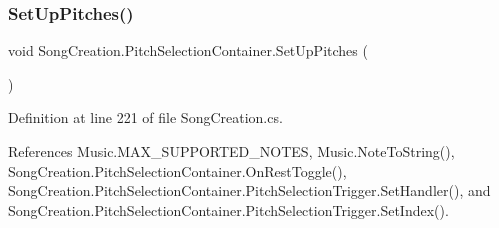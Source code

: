 \mbox{\label{group___s_c_handlers_ga77883e72bde65d22eaa2ace411fd9206}} 
\subsubsection{\texorpdfstring{Set\+Up\+Pitches()}{SetUpPitches()}}
{\footnotesize\ttfamily void Song\+Creation.\+Pitch\+Selection\+Container.\+Set\+Up\+Pitches (\begin{DoxyParamCaption}{ }\end{DoxyParamCaption})}



Definition at line 221 of file Song\+Creation.\+cs.



References Music.\+M\+A\+X\+\_\+\+S\+U\+P\+P\+O\+R\+T\+E\+D\+\_\+\+N\+O\+T\+ES, Music.\+Note\+To\+String(), Song\+Creation.\+Pitch\+Selection\+Container.\+On\+Rest\+Toggle(), Song\+Creation.\+Pitch\+Selection\+Container.\+Pitch\+Selection\+Trigger.\+Set\+Handler(), and Song\+Creation.\+Pitch\+Selection\+Container.\+Pitch\+Selection\+Trigger.\+Set\+Index().


